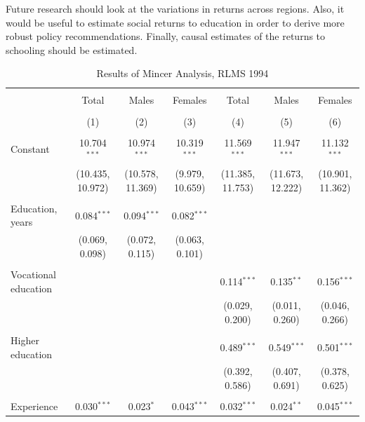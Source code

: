 \documentclass[alpha-refs]{wiley-article-01g}
\begin{document}
Future research should look at the variations in returns across regions.  Also, it would be useful to estimate social returns to education in order to derive more robust policy recommendations. Finally, causal estimates of the returns to schooling should be estimated.


\printbibliography

\newpage

\begin{landscape}

\fontsize{9}{11}
\selectfont

\begin{table}[!htbp] \centering 
\renewcommand{\arraystretch}{1.0}
  \caption{Results of Mincer Analysis, RLMS 1994} 
  \label{} 
\begin{tabular}{@{\extracolsep{5pt}}lcccccc} 
\\[-.8ex]\hline 
\hline \\[-.8ex] 
 & Total & Males & Females & Total & Males & Females \\ 
\\[-.8ex] & (1) & (2) & (3) & (4) & (5) & (6)\\ 
\hline \\[-.8ex] 
 Constant & 10.704$^{***}$ & 10.974$^{***}$ & 10.319$^{***}$ & 11.569$^{***}$ & 11.947$^{***}$ & 11.132$^{***}$ \\ 
  & (10.435, 10.972) & (10.578, 11.369) & (9.979, 10.659) & (11.385, 11.753) & (11.673, 12.222) & (10.901, 11.362) \\ 
  & & & & & & \\ 
 Education, years & 0.084$^{***}$ & 0.094$^{***}$ & 0.082$^{***}$ &  &  &  \\ 
  & (0.069, 0.098) & (0.072, 0.115) & (0.063, 0.101) &  &  &  \\ 
  & & & & & & \\ 
 Vocational education &  &  &  & 0.114$^{***}$ & 0.135$^{**}$ & 0.156$^{***}$ \\ 
  &  &  &  & (0.029, 0.200) & (0.011, 0.260) & (0.046, 0.266) \\ 
  & & & & & & \\ 
 Higher education &  &  &  & 0.489$^{***}$ & 0.549$^{***}$ & 0.501$^{***}$ \\ 
  &  &  &  & (0.392, 0.586) & (0.407, 0.691) & (0.378, 0.625) \\ 
  & & & & & & \\ 
 Experience & 0.030$^{***}$ & 0.023$^{*}$ & 0.043$^{***}$ & 0.032$^{***}$ & 0.024$^{**}$ & 0.045$^{***}$ \\ 

\end{tabular}
\end{table}
\end{landscape}
\end{document}
